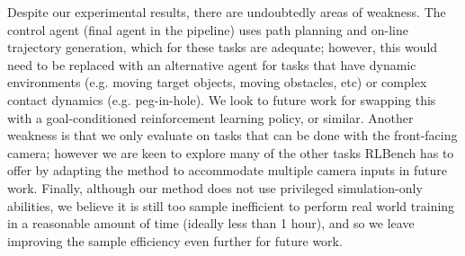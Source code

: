 \documentclass[letterpaper, 10 pt, journal, twoside]{IEEEtran}
\begin{document}
Despite our experimental results, there are undoubtedly areas of weakness. The control agent (final agent in the pipeline) uses path planning and on-line trajectory generation, which for these tasks are adequate; however, this would need to be replaced with an alternative agent for tasks that have dynamic environments (e.g. moving target objects, moving obstacles, etc) or complex contact dynamics (e.g. peg-in-hole). We look to future work for swapping this with a goal-conditioned reinforcement learning policy, or similar. Another weakness is that we only evaluate on tasks that can be done with the front-facing camera; however we are keen to explore many of the other tasks RLBench has to offer by adapting the method to accommodate multiple camera inputs in future work. Finally, although our method does not use privileged simulation-only abilities, we believe it is still too sample inefficient to perform real world training in a reasonable amount of time (ideally less than 1 hour), and so we leave improving the sample efficiency even further for future work.



\end{document}
